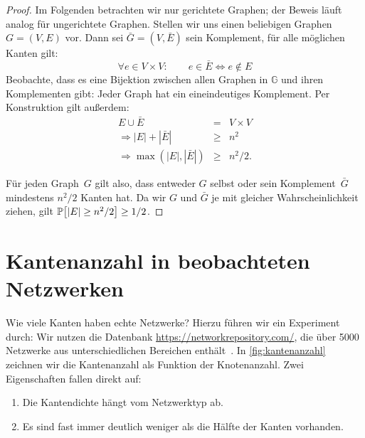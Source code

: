 \begin{proof}
    Im Folgenden betrachten wir nur gerichtete Graphen; der Beweis läuft analog für ungerichtete Graphen.
    Stellen wir uns einen beliebigen Graphen~$G = (V, E)$ vor.
    Dann sei $\bar G = (V, \bar E)$ sein Komplement, \dh für alle möglichen Kanten gilt:
    \begin{equation}
        \forall e \in V\times V\colon \quad\quad e \in \bar E \Leftrightarrow e \notin E
    \end{equation}
    Beobachte, dass es eine Bijektion zwischen allen Graphen in $\mathbb G$ und ihren Komplementen gibt: Jeder Graph hat ein eineindeutiges Komplement.
    Per Konstruktion gilt außerdem:
    \begin{eqnarray}
        E \cup \bar E &=& V \times V\\
        \Rightarrow |E| + |\bar E| &\ge& n^2\\
        \Rightarrow \max(|E|, |\bar E|) &\ge& n^2 / 2.
    \end{eqnarray}

    Für jeden Graph~$G$ gilt also, dass entweder $G$ selbst oder sein Komplement~$\bar G$ mindestens $n^2 / 2$ Kanten hat.
    Da wir $G$ und $\bar G$ je mit gleicher Wahrscheinlichkeit ziehen, gilt $\mathbb{P}\!\left[|E| \ge n^2 / 2\right] \ge 1/2$.
\end{proof}

\section{Kantenanzahl in beobachteten Netzwerken}\label{sec:kanten-in-beobachteten-netzen}
Wie viele Kanten haben echte Netzwerke? Hierzu führen wir ein Experiment durch:
Wir nutzen die Datenbank \url{https://networkrepository.com/}, die über 5000 Netzwerke aus unterschiedlichen Bereichen enthält~\cite{networkrepository}.
In \cref{fig:kantenanzahl} zeichnen wir die Kantenanzahl als Funktion der Knotenanzahl.
Zwei Eigenschaften fallen direkt auf:
\begin{enumerate}
    \item Die Kantendichte hängt vom Netzwerktyp ab.
    \item Es sind fast immer deutlich weniger als die Hälfte der Kanten vorhanden.
\end{enumerate}

